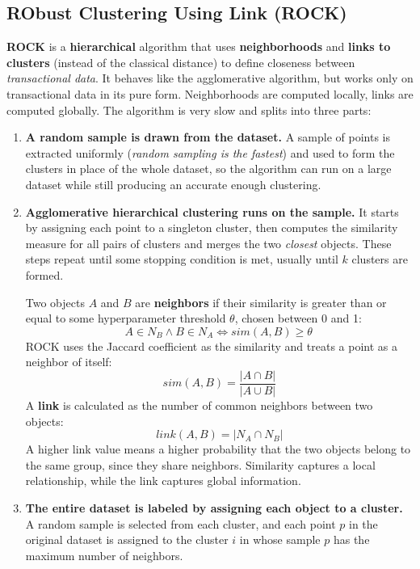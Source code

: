 \subsection{RObust Clustering Using Link (ROCK)}
\textbf{ROCK} is a \textbf{hierarchical} algorithm that uses \textbf{neighborhoods} and \textbf{links to clusters} (instead of the classical distance) to define closeness between \textit{transactional data}. It behaves like the agglomerative algorithm, but works only on transactional data in its pure form. Neighborhoods are computed locally, links are computed globally. The algorithm is very slow and splits into three parts:
\begin{enumerate}
    \item \textbf{A random sample is drawn from the dataset.} A sample of points is extracted uniformly (\textit{random sampling is the fastest}) and used to form the clusters in place of the whole dataset, so the algorithm can run on a large dataset while still producing an accurate enough clustering.

    \item \textbf{Agglomerative hierarchical clustering runs on the sample.} It starts by assigning each point to a singleton cluster, then computes the similarity measure for all pairs of clusters and merges the two \textit{closest} objects. These steps repeat until some stopping condition is met, usually until $k$ clusters are formed.

    Two objects $A$ and $B$ are \textbf{neighbors} if their similarity is greater than or equal to some hyperparameter threshold $\theta$, chosen between 0 and 1:
    \begin{equation*}
        A \in N_B \land B \in N_A \iff sim(A,B) \geq \theta \,
    \end{equation*}
    ROCK uses the Jaccard coefficient as the similarity and treats a point as a neighbor of itself:
    \begin{equation*}
        sim(A,B) = \dfrac{|A \cap B|}{|A \cup B|}
    \end{equation*}
A \textbf{link} is calculated as the number of common neighbors between two objects:
    \begin{equation*}
        link(A,B) = |N_A \cap N_B|
    \end{equation*}
    A higher link value means a higher probability that the two objects belong to the same group, since they share neighbors. Similarity captures a local relationship, while the link captures global information.

    \item \textbf{The entire dataset is labeled by assigning each object to a cluster.} A random sample is selected from each cluster, and each point $p$ in the original dataset is assigned to the cluster $i$ in whose sample $p$ has the maximum number of neighbors.
\end{enumerate}


